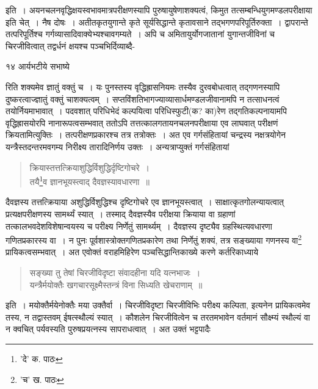 \documentclass[11pt, openany]{book}
\begin{document}
{\noindent इति~। अयनचलनवृद्धिक्षयस्वभावमात्रपरीक्षणस्यापि पुरुषायुषेणाशक्यत्वं, किमुत तत्सम्बन्धियुगमण्डलपरीक्षाया इति चेत्~। नैष दोषः~। अतीतकृतयुगान्ते कृते सूर्यसिद्धान्ते कृतावसाने तद्भगणपरिपूर्तिरुक्ता~। द्वापरान्ते तत्परिपूर्तिश्च गर्गव्यासादिवाक्येभ्यश्चावगम्यते~। अपि च अमितायुर्योगजातानां युगान्तजीविनां च चिरजीवित्वात् तद्वर्धनं क्षयश्च पञ्चभिर्दिव्याब्दै-

\newpage

\vspace{3cm} १४ \hspace{4cm}आर्यभटीये सभाष्ये

\vspace{0.3cm}
\noindent रिति शक्यमेव ज्ञातुं वक्तुं च~। यः पुनस्तस्य वृद्धिह्रासनियमः तस्यैव दुरवबोधत्वात् तद्गणनस्यापि दुष्करत्वाज्ज्ञातुं वक्तुं चाशक्यत्वम्~। सप्तविंशतिभागज्याव्यासार्धमण्डलजीवानामपि न तत्साधनत्वं तयोर्नियमाभावात्~। पदवशात् परिधिभेदं कल्पयित्वा परिधिस्फुटी(क? का)रेण तद्गतिकल्पनायामपि वृद्धिह्रासयोरपि नानारूपत्वसम्भवात् ततोऽपि तत्तत्कालगतायनचलनपरीक्षाया एव लाघवात् परीक्षणं क्रियतामित्युक्तिः~। तत्परीक्षणप्रकारश्च तत्र तत्रोक्तः~। अत एव गर्गसंहितायां चन्द्रस्य नक्षत्रयोगेन यन्त्रैस्तदन्तरमवगम्य निरीक्ष्य तारादिनिर्णय उक्तः~। अन्यत्राप्युक्तं गर्गसंहितायां\textendash

\begin{quote}
{\qt क्रियास्तत्तत्क्रियाशुद्धिर्विशुद्धिर्दृष्टिगोचरे~।\\
तयै\renewcommand{\thefootnote}{१}\footnote{'दे' क. पाठः}व ज्ञानभूयस्त्वाद् दैवज्ञस्यावधारणा~॥}
\end{quote}

\noindent दैवज्ञस्य तत्तत्क्रियाया अशुद्धिर्विशुद्धिश्च दृष्टिगोचरे एव ज्ञानभूयस्त्वात्~। साक्षात्कृतगोलन्यायत्वात् प्रत्यक्षपरीक्षणस्य सामर्थ्यं स्यात्~। तस्माद् दैवज्ञस्यैव परीक्षया क्रियाया वा ग्रहाणां तत्कालभवदेशविशेषान्वयस्य च परीक्ष्य निर्णेतुं सामर्थ्यम्~। दैवज्ञस्य दृष्ट्यैव ग्रहस्थित्यवधारणा गणितप्रकारस्य वा~। न पुनः पूर्वशास्त्रोक्तगणितप्रकारेण तथा निर्णेतुं शक्यं, तत्र सङ्ख्याया गणनस्य वा\renewcommand{\thefootnote}{२}\footnote{'च' ख. पाठः} प्रायिकत्वसम्भवात्~। अत एवोक्तं वराहमिहिरेण पञ्चसिद्धान्तिकाख्ये करणे कर्तरिकाध्याये\textendash 

\begin{quote}
{\qt सङ्ख्या तु तेषां चिरजीविदृष्टा संवादहीना यदि यत्नभाजः~।\\
यन्त्रैर्मयोक्तैः खगचारसूक्ष्मैस्तन्त्रं विना सिध्यति खेचराणाम्~॥}
\end{quote}

\noindent इति~। मयोक्तैर्मयेनोक्तैः मया उक्तैर्वा~। चिरजीविदृष्टा चिरजीविभिः परीक्ष्य कल्पिता, इत्यनेन प्रायिकत्वमेव तस्य, न तद्वास्तवम् ईषत्स्थौल्यं स्यात्~। कौशलेन चिरजीवित्वेन च तरतमभावेन वर्तमानं सौक्ष्म्यं स्थौल्यं वा न क्वचित् पर्यवस्यति पुरुषप्रयत्नस्य सापराधत्वात्~। अत उक्तं भट्टपादैः\textendash

}
\end{document}
